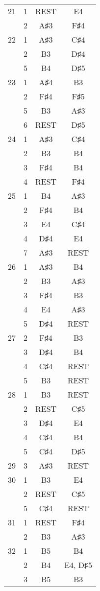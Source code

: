 \documentclass{article}
\begin{document}
\begin{longtable}{|c|c|c|c|}
\hline
21 & 1 & REST & E4 \\ 
  & 2 & A♯3 & F♯4 \\ 
\hline
22 & 1 & A♯3 & C♯4 \\ 
  & 2 & B3 & D♯4 \\ 
  & 5 & B4 & D♯5 \\ 
\hline
23 & 1 & A♯4 & B3 \\ 
  & 2 & F♯4 & F♯5 \\ 
  & 5 & B3 & A♯3 \\ 
  & 6 & REST & D♯5 \\ 
\hline
24 & 1 & A♯3 & C♯4 \\ 
  & 2 & B3 & B4 \\ 
  & 3 & F♯4 & B4 \\ 
  & 4 & REST & F♯4 \\ 
\hline
25 & 1 & B4 & A♯3 \\ 
  & 2 & F♯4 & B4 \\ 
  & 3 & E4 & C♯4 \\ 
  & 4 & D♯4 & E4 \\ 
  & 7 & A♯3 & REST \\ 
\hline
26 & 1 & A♯3 & B4 \\ 
  & 2 & B3 & A♯3 \\ 
  & 3 & F♯4 & B3 \\ 
  & 4 & E4 & A♯3 \\ 
  & 5 & D♯4 & REST \\ 
\hline
27 & 2 & F♯4 & B3 \\ 
  & 3 & D♯4 & B4 \\ 
  & 4 & C♯4 & REST \\ 
  & 5 & B3 & REST \\ 
\hline
28 & 1 & B3 & REST \\ 
  & 2 & REST & C♯5 \\ 
  & 3 & D♯4 & E4 \\ 
  & 4 & C♯4 & B4 \\ 
  & 5 & C♯4 & D♯5 \\ 
\hline
29 & 3 & A♯3 & REST \\ 
\hline
30 & 1 & B3 & E4 \\ 
  & 2 & REST & C♯5 \\ 
  & 5 & C♯4 & REST \\ 
\hline
31 & 1 & REST & F♯4 \\ 
  & 2 & B3 & A♯3 \\ 
\hline
32 & 1 & B5 & B4 \\ 
  & 2 & B4 & E4, D♯5 \\ 
  & 3 & B5 & B3 \\ 

\end{longtable}
\end{document}
